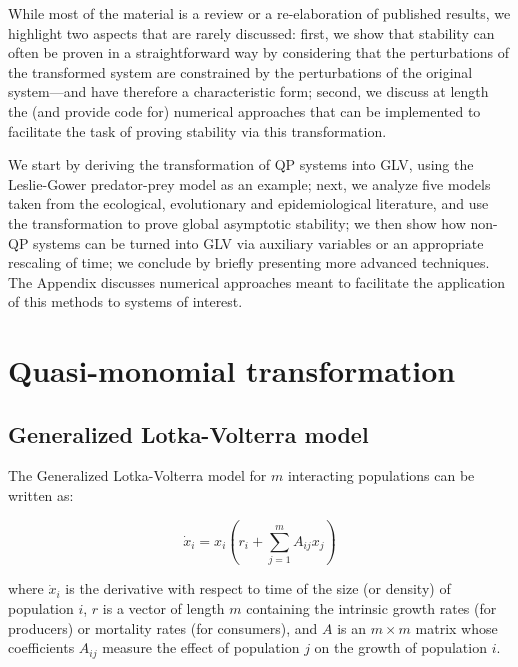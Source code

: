 \documentclass{article}
\begin{document}
While most of the material is a review or a re-elaboration of published
results, we highlight two aspects that are rarely discussed: first, we
show that stability can often be proven in a straightforward way by
considering that the perturbations of the transformed system are
constrained by the perturbations of the original system---and have
therefore a characteristic form; second, we discuss at length the (and
provide code for) numerical approaches that can be implemented to
facilitate the task of proving stability via this transformation.

We start by deriving the transformation of QP systems into GLV, using
the Leslie-Gower predator-prey model as an example; next, we analyze
five models taken from the ecological, evolutionary and epidemiological
literature, and use the transformation to prove global asymptotic
stability; we then show how non-QP systems can be turned into GLV via
auxiliary variables or an appropriate rescaling of time; we conclude by
briefly presenting more advanced techniques. The Appendix discusses
numerical approaches meant to facilitate the application of this methods
to systems of interest.

\hypertarget{quasi-monomial-transformation}{%
\section{Quasi-monomial
transformation}\label{quasi-monomial-transformation}}

\hypertarget{generalized-lotka-volterra-model}{%
\subsection{Generalized Lotka-Volterra
model}\label{generalized-lotka-volterra-model}}

\label{sec:glv}

The Generalized Lotka-Volterra model for \(m\) interacting populations
can be written as:

\begin{equation}
\label{eq:glv}
\dot{x}_i = x_i \left(r_i + \sum_{j=1}^m A_{ij} x_j \right)
\end{equation}

where \(\dot{x}_i\) is the derivative with respect to time of the size
(or density) of population \(i\), \(r\) is a vector of length \(m\)
containing the intrinsic growth rates (for producers) or mortality rates
(for consumers), and \(A\) is an \(m \times m\) matrix whose
coefficients \(A_{ij}\) measure the effect of population \(j\) on the
growth of population \(i\).
\end{document}
